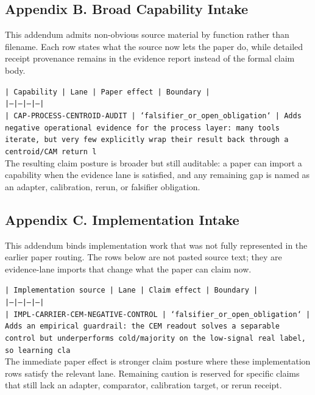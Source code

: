 \documentclass[11pt]{article}
\begin{document}
\subsection*{Appendix B. Broad Capability Intake}

This addendum admits non-obvious source material by function rather than filename. Each row states what the source now lets the paper do, while detailed receipt provenance remains in the evidence report instead of the formal claim body.

\noindent\texttt{| Capability | Lane | Paper effect | Boundary |}\\
\noindent\texttt{|---|---|---|---|}\\
\noindent\texttt{| CAP-PROCESS-CENTROID-AUDIT | `falsifier\_or\_open\_obligation` | Adds negative operational evidence for the process layer: many tools iterate, but very few explicitly wrap their result back through a centroid/CAM return l}\\

The resulting claim posture is broader but still auditable: a paper can import a capability when the evidence lane is satisfied, and any remaining gap is named as an adapter, calibration, rerun, or falsifier obligation.

\subsection*{Appendix C. Implementation Intake}

This addendum binds implementation work that was not fully represented in the earlier paper routing. The rows below are not pasted source text; they are evidence-lane imports that change what the paper can claim now.

\noindent\texttt{| Implementation source | Lane | Claim effect | Boundary |}\\
\noindent\texttt{|---|---|---|---|}\\
\noindent\texttt{| IMPL-CARRIER-CEM-NEGATIVE-CONTROL | `falsifier\_or\_open\_obligation` | Adds an empirical guardrail: the CEM readout solves a separable control but underperforms cold/majority on the low-signal real label, so learning cla}\\

The immediate paper effect is stronger claim posture where these implementation rows satisfy the relevant lane. Remaining caution is reserved for specific claims that still lack an adapter, comparator, calibration target, or rerun receipt.
\end{document}

